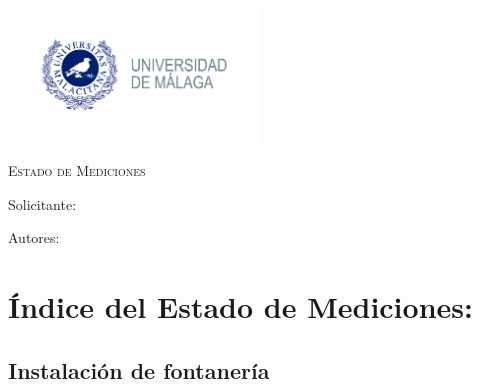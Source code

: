\documentclass[../main.tex]{subfiles}
\begin{document}
\newpage
\thispagestyle{empty}
\begin{center}
    {\includegraphics[width=0.5\textwidth]{Imagenes/Logo UMA.jpg}\par}
    \vspace{1cm}
    {\bfseries\LARGE \Facultad \par}
    \vspace{0.5cm}
    {\scshape\Large \Grado \par}
    \vspace{3cm}
    {\scshape\Huge Estado de Mediciones \par}
    \vspace{1.5cm}
    {\itshape\Large \TituloProyecto \par}
    \vfill
    {\Large Solicitante: \par}
    {\Large \Solicitante  \par}
    \vspace{1cm}
    {\Large Autores: \par}
    {\Large \Autora \par}
    {\Large \Autor \par}
    \vfill
    {\Large \Fecha \par}
\end{center}


\chapter*{Índice del Estado de Mediciones:}
\newpage
{}


\section{Instalación de fontanería}
\end{document}
